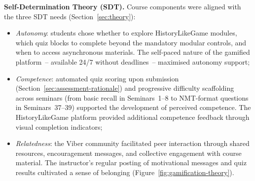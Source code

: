 \textbf{Self-Determination Theory (SDT).} Course components were aligned with the three SDT needs (Section~\ref{sec:theory}):

\begin{itemize}
\item \emph{Autonomy}: students chose whether to explore HistoryLikeGame modules, which quiz blocks to complete beyond the mandatory modular controls, and when to access asynchronous materials. The self-paced nature of the gamified platform~-- available 24/7 without deadlines~-- maximised autonomy support;
\item \emph{Competence}: automated quiz scoring upon submission (Section~\ref{sec:assessment-rationale}) and progressive difficulty scaffolding across seminars (from basic recall in Seminars~1--8 to NMT-format questions in Seminars~37--39) supported the development of perceived competence. The HistoryLikeGame platform provided additional competence feedback through visual completion indicators;
\item \emph{Relatedness}: the Viber community facilitated peer interaction through shared resources, encouragement messages, and collective engagement with course material. The instructor's regular posting of motivational messages and quiz results cultivated a sense of belonging (Figure~\ref{fig:gamification-theory}).
\end{itemize}

